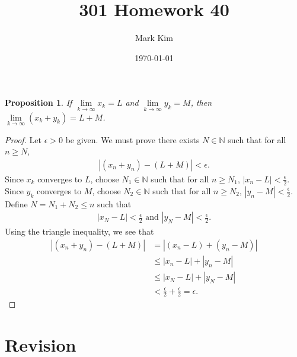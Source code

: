 \documentclass[12pt]{amsart}
\title{301 Homework 40}
\author{Mark Kim}
\date{\today}
\newcommand{\N}{\mathbb{N}}
\newtheorem*{proposition}{Proposition}
\begin{document}
\maketitle

\begin{proposition}
If $\lim\limits_{k\rightarrow\infty}x_k = L$ and $\lim\limits_{k\rightarrow\infty}y_k = M$, then $\lim\limits_{k\rightarrow\infty}(x_k +y_k) = L+M$.
\end{proposition}

\begin{proof}
Let $\epsilon>0$ be given.  We must prove there exists $N\in\N$ such that for all $n\geq N$,
\begin{align*}
\left\lvert (x_n + y_n) - (L + M)\right\rvert < \epsilon.
\end{align*}
Since $x_k$ converges to $L$, choose $N_1\in\N$ such that for all $n\geq N_1$, $\left\lvert x_n - L \right\rvert < \frac{\epsilon}{2}$.\\
Since $y_k$ converges to $M$, choose $N_2\in\N$ such that for all $n\geq N_2$, $\left\lvert y_n - M \right\rvert < \frac{\epsilon}{2}$.\\
Define $N=N_1+N_2\leq n$ such that
\begin{align*}
\left\lvert x_N - L \right\rvert < \frac{\epsilon}{2} \text{ and } \left\lvert y_N - M \right\rvert < \frac{\epsilon}{2}.
\end{align*}
Using the triangle inequality, we see that
\begin{align*}
\left\lvert (x_n + y_n) - (L + M)\right\rvert &= \left\lvert (x_n - L) + (y_n - M) \right\rvert\\
&\leq \left\lvert x_n - L \right\rvert + \left\lvert y_n - M \right\rvert\\
&\leq \left\lvert x_N - L \right\rvert + \left\lvert y_N - M \right\rvert\\
&< \frac{\epsilon}{2} + \frac{\epsilon}{2} = \epsilon.
\end{align*}
\end{proof}

\section*{Revision}
\end{document}

